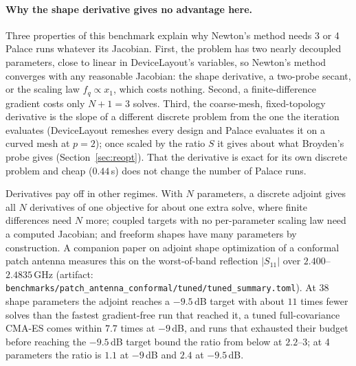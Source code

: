 \documentclass{anvil-paper}
\begin{document}
\paragraph{Why the shape derivative gives no advantage here.}
Three properties of this benchmark explain why Newton's method needs 3
or 4 Palace runs whatever its Jacobian. First, the problem has
two nearly decoupled parameters, close to linear in DeviceLayout's
variables, so Newton's method converges with any reasonable Jacobian: the
shape derivative, a two-probe secant, or the scaling law $f_q \propto x_1$,
which costs nothing. Second, a finite-difference gradient costs only $N+1 =
3$ solves. Third, the coarse-mesh, fixed-topology derivative is the slope
of a different discrete problem from the one the iteration evaluates
(DeviceLayout remeshes every design and Palace evaluates it on a curved
mesh at $p = 2$); once scaled by the ratio $S$ it gives about what
Broyden's probe gives (Section~\ref{sec:reopt}). That the derivative is exact for its own
discrete problem and cheap ($0.44$\,s) does not change the number of
Palace runs.

Derivatives pay off in other regimes. With $N$ parameters, a discrete
adjoint gives all $N$ derivatives of one objective for about one extra
solve, where finite differences need $N$ more; coupled targets with no
per-parameter scaling law need a computed Jacobian; and freeform shapes
have many parameters by construction. A companion paper on adjoint shape
optimization of a conformal patch antenna \citep{walters2026conformal}
measures this on the worst-of-band reflection $|S_{11}|$ over
$2.400$--$2.4835$\,GHz (artifact:
\texttt{benchmarks/patch\_antenna\_conformal/tuned/tuned\_summary.toml}).
At 38 shape parameters the adjoint reaches a $-9.5$\,dB target with about
$11$ times fewer solves than the fastest gradient-free run that reached it,
a tuned full-covariance CMA-ES comes within $7.7$ times at $-9$\,dB, and
runs that exhausted their budget before reaching the $-9.5$\,dB target
bound the ratio from below at $2.2$--$3$; at 4 parameters the ratio is $1.1$ at
$-9$\,dB and $2.4$ at $-9.5$\,dB.
\end{document}
